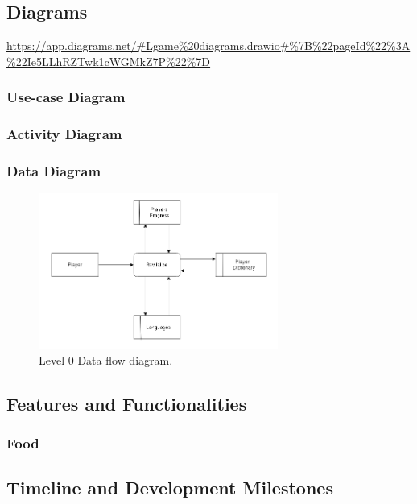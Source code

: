 \documentclass[11pt]{article}
\begin{document}
\subsection{Diagrams}
\url{https://app.diagrams.net/#Lgame%20diagrams.drawio#%7B%22pageId%22%3A%22Ie5LLhRZTwk1cWGMkZ7P%22%7D}

\subsubsection{Use-case Diagram}
\subsubsection{Activity Diagram}
\subsubsection{Data Diagram}

\begin{figure}[h!]
  \centering
  \includegraphics[width=0.7\textwidth]{diagrams/dfd01.png}
  \caption{Level 0 Data flow diagram.}
  \label{fig:dfd0}
\end{figure}

\subsection{Features and Functionalities}
\subsubsection{Food}


\subsection{Timeline and Development Milestones}
\end{document}
